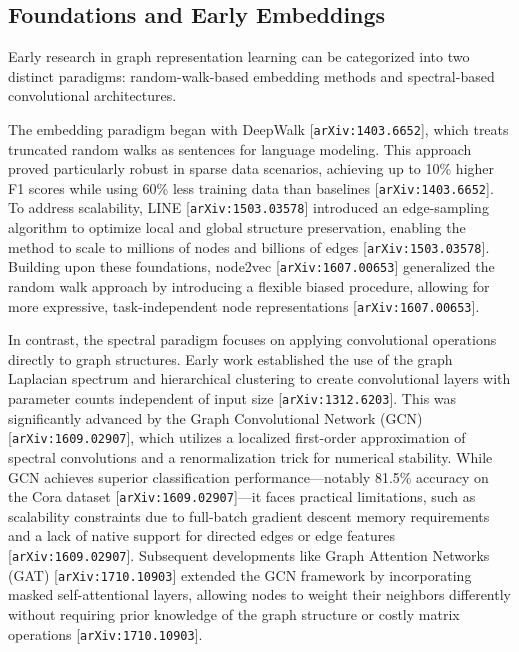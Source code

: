 \documentclass[11pt]{article}
\begin{document}
\subsection{Foundations and Early Embeddings}

Early research in graph representation learning can be categorized into two distinct paradigms: random-walk-based embedding methods and spectral-based convolutional architectures.

The embedding paradigm began with DeepWalk [\texttt{arXiv:1403.6652}], which treats truncated random walks as sentences for language modeling. This approach proved particularly robust in sparse data scenarios, achieving up to 10\% higher F1 scores while using 60\% less training data than baselines [\texttt{arXiv:1403.6652}]. To address scalability, LINE [\texttt{arXiv:1503.03578}] introduced an edge-sampling algorithm to optimize local and global structure preservation, enabling the method to scale to millions of nodes and billions of edges [\texttt{arXiv:1503.03578}]. Building upon these foundations, node2vec [\texttt{arXiv:1607.00653}] generalized the random walk approach by introducing a flexible biased procedure, allowing for more expressive, task-independent node representations [\texttt{arXiv:1607.00653}].

In contrast, the spectral paradigm focuses on applying convolutional operations directly to graph structures. Early work established the use of the graph Laplacian spectrum and hierarchical clustering to create convolutional layers with parameter counts independent of input size [\texttt{arXiv:1312.6203}]. This was significantly advanced by the Graph Convolutional Network (GCN) [\texttt{arXiv:1609.02907}], which utilizes a localized first-order approximation of spectral convolutions and a renormalization trick for numerical stability. While GCN achieves superior classification performance—notably 81.5\% accuracy on the Cora dataset [\texttt{arXiv:1609.02907}]—it faces practical limitations, such as scalability constraints due to full-batch gradient descent memory requirements and a lack of native support for directed edges or edge features [\texttt{arXiv:1609.02907}]. Subsequent developments like Graph Attention Networks (GAT) [\texttt{arXiv:1710.10903}] extended the GCN framework by incorporating masked self-attentional layers, allowing nodes to weight their neighbors differently without requiring prior knowledge of the graph structure or costly matrix operations [\texttt{arXiv:1710.10903}].
\end{document}
